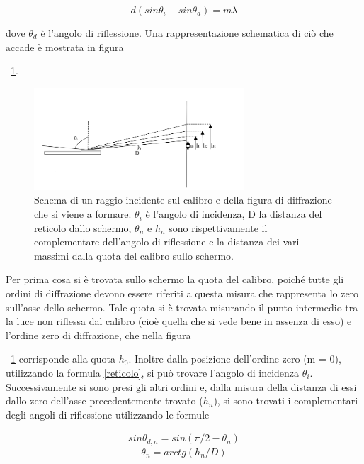 \documentclass[a4paper,10pt]{article}
\begin{document}
\begin{equation}
d(sin\theta_i - sin\theta_d)= m\lambda
\label{reticolo}
\end{equation}

dove $\theta_d$ è l'angolo di riflessione.
Una rappresentazione schematica di ciò che accade è mostrata in figura \figurename{~\ref{fig:espa}.

\begin{figure}[H]
	\centering
	\includegraphics[width=0.7\textwidth]{../grafici/espa.png}
	\caption{Schema di un raggio incidente sul calibro e della figura di diffrazione che si viene a formare. $\theta_i$ è l'angolo di incidenza, D la distanza del reticolo dallo schermo, $\theta_n$ e $h_n$ sono rispettivamente il complementare dell'angolo di riflessione e la distanza dei vari massimi dalla quota del calibro sullo schermo.}
	\label{fig:espa}
\end{figure}

Per prima cosa si è trovata sullo schermo la quota del calibro, poiché tutte gli ordini di diffrazione devono essere riferiti a questa misura che rappresenta lo zero sull'asse dello schermo. Tale quota si è trovata misurando il punto intermedio tra la luce non riflessa dal calibro (cioè quella che si vede bene in assenza di esso) e l'ordine zero di diffrazione, che nella figura \figurename{~\ref{fig:espa} corrisponde alla quota $h_0$. Inoltre dalla posizione dell'ordine zero (m = 0), utilizzando la formula \ref{reticolo}, si può trovare l'angolo di incidenza $\theta_i$. Successivamente si sono presi gli altri ordini e, dalla misura della distanza di essi dallo zero dell'asse precedentemente trovato ($h_n$), si sono trovati i complementari degli angoli di riflessione utilizzando le formule

\begin{align*}
sin\theta_{d,n} = sin(\pi/2 - \theta_n)
\end{align*}
\begin{equation}
\theta_n = arctg(h_n/D)
\end{equation}

}}
\end{document}
